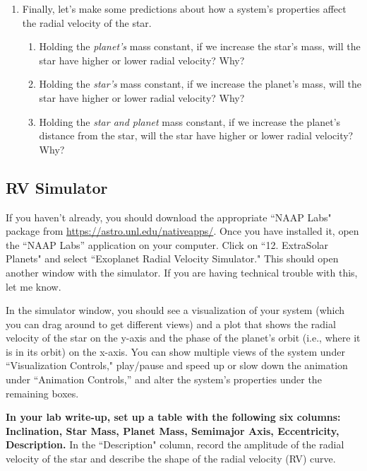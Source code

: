 \documentclass[11pt]{article}
\begin{document}
\begin{enumerate}[resume]
    \item Finally, let's make some predictions about how a system's properties affect the radial velocity of the star.
    \begin{enumerate}
        \item Holding the \textit{planet's} mass constant, if we increase the star's mass, will the star have higher or lower radial velocity? Why?
        
        \item Holding the \textit{star's} mass constant, if we increase the planet's mass, will the star have higher or lower radial velocity? Why?
        
        \item Holding the \textit{star and planet} mass constant, if we increase the planet's distance from the star, will the star have higher or lower radial velocity? Why?
    \end{enumerate}
        
\end{enumerate}

\subsection{RV Simulator}
\noindent
If you haven't already, you should download the appropriate ``NAAP Labs" package from \url{https://astro.unl.edu/nativeapps/}. Once you have installed it, open the ``NAAP Labs'' application on your computer. Click on ``12. ExtraSolar Planets" and select ``Exoplanet Radial Velocity Simulator."  This should open another window with the simulator. If you are having technical trouble with this, let me know.

\medskip \noindent
In the simulator window, you should see a visualization of your system (which you can drag around to get different views) and a plot that shows the radial velocity of the star on the y-axis and the phase of the planet's orbit (i.e., where it is in its orbit) on the x-axis. You can show multiple views of the system under ``Visualization Controls," play/pause and speed up or slow down the animation under ``Animation Controls,'' and alter the system's properties under the remaining boxes.

\medskip \noindent
\textbf{In your lab write-up, set up a table with the following six columns: Inclination, Star Mass, Planet Mass, Semimajor Axis, Eccentricity, Description.} In the ``Description" column,  record the amplitude of the radial velocity of the star and describe the shape of the radial velocity (RV) curve.
\end{document}
